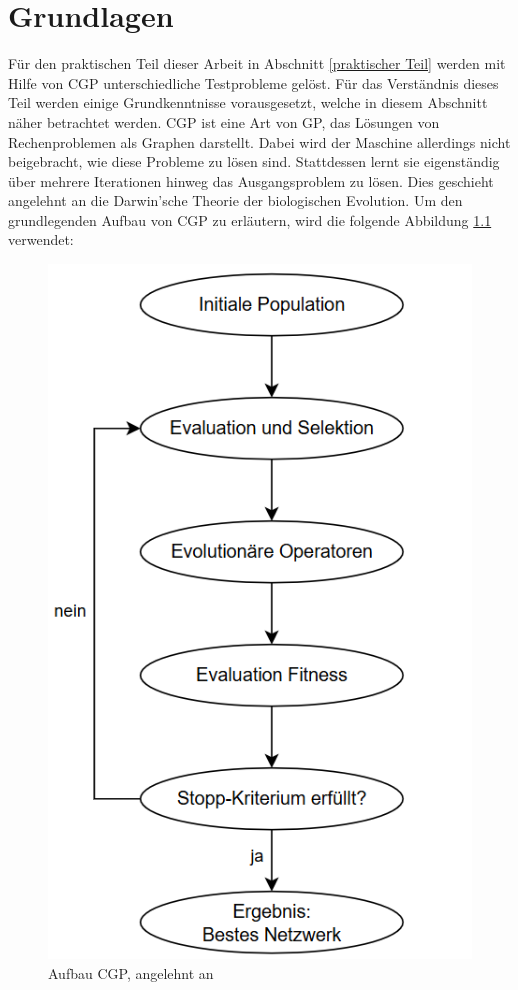 \chapter{Grundlagen}
\label{Grundlagen}

Für den praktischen Teil dieser Arbeit in Abschnitt \ref{praktischer Teil} werden mit Hilfe von CGP unterschiedliche Testprobleme gelöst. 
Für das Verständnis dieses Teil werden einige Grundkenntnisse vorausgesetzt, welche in diesem Abschnitt näher betrachtet werden.\newline
CGP ist eine Art von GP, das Lösungen von Rechenproblemen als Graphen darstellt. \cite{miller_cartesian_2020}
Dabei wird der Maschine allerdings nicht beigebracht, wie diese Probleme zu lösen sind.
Stattdessen lernt sie eigenständig über mehrere Iterationen hinweg das Ausgangsproblem zu lösen.
Dies geschieht angelehnt an die Darwin’sche Theorie der biologischen Evolution. \cite{milad_taleby_ahvanooey_survey_2019} \newline
Um den grundlegenden Aufbau von CGP zu erläutern, wird die folgende Abbildung \ref{fig:aufbauCGP} verwendet:

\begin{figure}[H]
    \centering
    \includegraphics[scale = 0.43]{Bilder/AufbauCGPVorgehenNachbildung.png}
    \caption{Aufbau CGP, angelehnt an \cite{torabi_using_2022}}
    \label{fig:aufbauCGP}
\end{figure}

